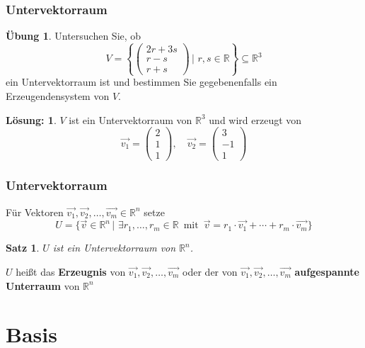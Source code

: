 \documentclass[hyperref={pdfpagelabels=false}]{beamer}
\theoremstyle{plain}%
\newtheorem*{satz}{Satz}
\theoremstyle{definition}
\newtheorem*{uebung}{Übung}
\newtheorem*{sol}{Lösung:}
\theoremstyle{remark}
\def \R{\mathbb R}
\newcommand{\vektor}[1]{\overrightarrow{#1}}
\begin{document}
\begin{frame}
\frametitle{Untervektorraum}

\begin{uebung} Untersuchen Sie, ob
	$$ V = \left\{ \begin{pmatrix} 2r + 3s \\ r-s \\ r+s \end{pmatrix} \,\vert \,\,r, s \in \R \right\} \subseteq \R^3 $$
ein Untervektorraum ist und bestimmen Sie gegebenenfalls ein Erzeugendensystem von $V$. 
\end{uebung}

\pause \pause 
\begin{sol}
$V$ ist ein Untervektorraum von $\R^3$ und wird erzeugt von 
	$$\vektor{v_1} = \left( \begin{matrix} 2 \\ 1 \\ 1 \end{matrix} \right), \quad 
	\vektor{v_2} = \left( \begin{matrix} 3 \\ -1 \\  1 \end{matrix} \right) $$ 
\end{sol}

\end{frame}

\begin{frame}
\frametitle{Untervektorraum}
 Für Vektoren $\vektor{v_1}, \vektor{v_2}, \ldots, 
\vektor{v_m} \in \mathbb R^n$ setze
  	$$ U = \{ \vektor{v} \in \mathbb R^n \, \vert \, \, \exists r_1, \ldots, r_m \in 
	\mathbb R \, \textrm{ mit } \,
   	\vektor{v} = r_1 \cdot \vektor{v_1} + \cdots + r_m \cdot \vektor{v_m} \} $$

\pause 
\begin{satz} $U$ ist ein Untervektorraum von $\mathbb R^n$.
\end{satz}

\pause 

$U$ heißt das \textbf{Erzeugnis} von $\vektor{v_1}, \vektor{v_2}, \ldots, \vektor{v_m}$ 
oder der von $\vektor{v_1}, \vektor{v_2}, \ldots, \vektor{v_m}$
\textbf{aufgespannte Unterraum} von $\mathbb R^n$
\end{frame}

\section{Basis}
\end{document}
